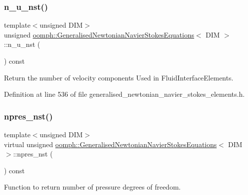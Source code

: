 \subsubsection{\texorpdfstring{n\+\_\+u\+\_\+nst()}{n\_u\_nst()}}
{\footnotesize\ttfamily template$<$unsigned D\+IM$>$ \\
unsigned \hyperlink{classoomph_1_1GeneralisedNewtonianNavierStokesEquations}{oomph\+::\+Generalised\+Newtonian\+Navier\+Stokes\+Equations}$<$ D\+IM $>$\+::n\+\_\+u\+\_\+nst (\begin{DoxyParamCaption}{ }\end{DoxyParamCaption}) const\hspace{0.3cm}{\ttfamily [inline]}}



Return the number of velocity components Used in Fluid\+Interface\+Elements. 



Definition at line 536 of file generalised\+\_\+newtonian\+\_\+navier\+\_\+stokes\+\_\+elements.\+h.

\mbox{\label{classoomph_1_1GeneralisedNewtonianNavierStokesEquations_ad25a5d1b7a7e7cf128b9154f08739824}} 
\subsubsection{\texorpdfstring{npres\+\_\+nst()}{npres\_nst()}}
{\footnotesize\ttfamily template$<$unsigned D\+IM$>$ \\
virtual unsigned \hyperlink{classoomph_1_1GeneralisedNewtonianNavierStokesEquations}{oomph\+::\+Generalised\+Newtonian\+Navier\+Stokes\+Equations}$<$ D\+IM $>$\+::npres\+\_\+nst (\begin{DoxyParamCaption}{ }\end{DoxyParamCaption}) const\hspace{0.3cm}{\ttfamily [pure virtual]}}



Function to return number of pressure degrees of freedom. 



